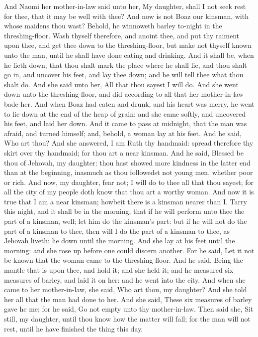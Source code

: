 And Naomi her mother-in-law said unto her, My daughter, shall I not seek rest for thee, that it may be well with thee? And now is not Boaz our kinsman, with whose maidens thou wast? Behold, he winnoweth barley to-night in the threshing-floor. Wash thyself therefore, and anoint thee, and put thy raiment upon thee, and get thee down to the threshing-floor, but make not thyself known unto the man, until he shall have done eating and drinking. And it shall be, when he lieth down, that thou shalt mark the place where he shall lie, and thou shalt go in, and uncover his feet, and lay thee down; and he will tell thee what thou shalt do. And she said unto her, All that thou sayest I will do.  And she went down unto the threshing-floor, and did according to all that her mother-in-law bade her. And when Boaz had eaten and drunk, and his heart was merry, he went to lie down at the end of the heap of grain: and she came softly, and uncovered his feet, and laid her down. And it came to pass at midnight, that the man was afraid, and turned himself; and, behold, a woman lay at his feet. And he said, Who art thou? And she answered, I am Ruth thy handmaid: spread therefore thy skirt over thy handmaid; for thou art a near kinsman. And he said, Blessed be thou of Jehovah, my daughter: thou hast showed more kindness in the latter end than at the beginning, inasmuch as thou followedst not young men, whether poor or rich. And now, my daughter, fear not; I will do to thee all that thou sayest; for all the city of my people doth know that thou art a worthy woman. And now it is true that I am a near kinsman; howbeit there is a kinsman nearer than I. Tarry this night, and it shall be in the morning, that if he will perform unto thee the part of a kinsman, well; let him do the kinsman’s part: but if he will not do the part of a kinsman to thee, then will I do the part of a kinsman to thee, as Jehovah liveth: lie down until the morning.  And she lay at his feet until the morning: and she rose up before one could discern another. For he said, Let it not be known that the woman came to the threshing-floor. And he said, Bring the mantle that is upon thee, and hold it; and she held it; and he measured six measures of barley, and laid it on her: and he went into the city. And when she came to her mother-in-law, she said, Who art thou, my daughter? And she told her all that the man had done to her. And she said, These six measures of barley gave he me; for he said, Go not empty unto thy mother-in-law. Then said she, Sit still, my daughter, until thou know how the matter will fall; for the man will not rest, until he have finished the thing this day. 


